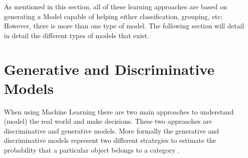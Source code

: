 \vspace{5mm} %

As mentioned in this section, all of these learning approaches are based on generating a Model capable of helping either classification, grouping, etc; However, there is more than one type of model. The following section will detail in detail the different types of models that exist.

\section{Generative and Discriminative Models}

When using Machine Learning there are two main approaches to understand (model) the real world and make decisions. These two approaches are discriminative and generative models. More formally the generative and discriminative models represent two different strategies to estimate the probability that a particular object belongs to a category \cite{Reference42}.


\vspace{5mm} %

